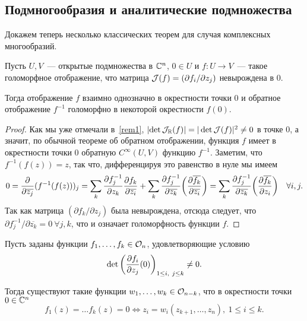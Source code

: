     \subsection{Подмногообразия и аналитические подмножества}
    
    Докажем теперь несколько классических теорем для случая комплексных многообразий. 
    
    \begin{theorem}
        Пусть $U, V$~--- открытые подмножества в $\C^n$, $0 \in U$ и $f\colon U \to V$~---
        такое голоморфное отображение, что матрица $\cJ(f) = \lr*{\partial f_i / \partial z_{j}}$ невырождена в $0$.
        
        Тогда отображение $f$ взаимно однозначно в окрестности точки $0$ и обратное отображение $f^{-1}$
        голоморфно в некоторой окрестности $f(0)$.
    \end{theorem}
    
    \begin{proof}
        Как мы уже отмечали в~\ref{rem1}, $\left\lvert \det \cJ_{\R}(f) \right\rvert = |\det{\cJ(f)}|^2 \neq 0$ в точке $0$, а
        значит, по обычной теореме об обратном отображении, функция $f$ имеет в окрестности точки $0$
        обратную $C^{\infty}(U, V)$ функцию $f^{-1}$. Заметим, что $f^{-1}(f(z)) = z$, так что,
        дифференцируя это равенство в нуле мы имеем
        \[ 0 = \frac{\partial}{\partial \overline{z_j}}(f^{-1}(f(z)))_{j} = \sum_{k} \frac{\partial f^{-1}_{j}}{\partial z_k}\frac{\partial f_k}{\partial \overline{z_i}} + \sum_{k} \frac{\partial f^{-1}_{j}}{\partial \overline{z_k}}\lr*{\frac{\partial \overline{f_k}}{\partial\overline{z_i}}} = \sum_{k} \frac{\partial f_{j}^{-1}}{\partial \overline{z_k}} \lr*{\frac{\partial \overline{f_k}}{\partial z_i}} \quad \forall i, j. \]
        Так как матрица $(\partial f_k / \partial z_j)$ была невырождена, отсюда следует, что
        $\partial f_j^{-1} / \partial \overline{z_k} = 0 \ \forall j, k$, что и означает голоморфность функции $f$.
    \end{proof}

    \begin{theorem}\label{Complex_implicit_function}
        Пусть заданы функции $f_1, \ldots, f_k \in \cO_n$, удовлетворяющие условию
        \[ \det{\lr*{\frac{\partial f_i}{\partial z_j}(0)}}_{1 \le i, \ j \le k} \neq 0. \]

        Тогда существуют такие функции $w_1, \ldots, w_k \in \cO_{n - k}$, что в окрестности точки $0 \in \C^n$
        \[ f_1(z) = \ldots f_k(z) = 0 \Leftrightarrow z_i = w_i(z_{k + 1}, \ldots, z_n), \ 1 \le i \le k.  \]

    \end{theorem}

